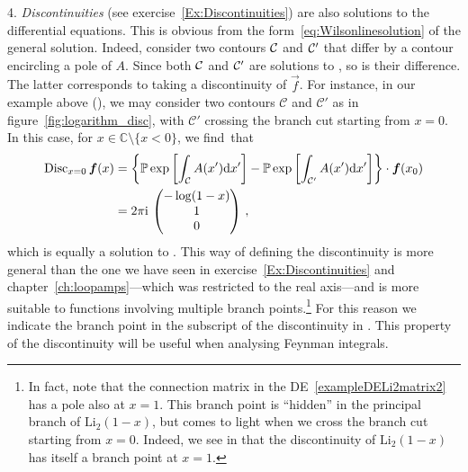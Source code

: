4. {\it Discontinuities} (see exercise~\ref{Ex:Discontinuities}) are also solutions to the differential equations. 
This is obvious from the form~\eqref{eq:Wilsonlinesolution} of the general solution.
Indeed, consider two contours ${\cal C}$ and ${\cal C'}$ that differ by a contour encircling a pole of $A$. 
Since both  ${\cal C}$ and ${\cal C'}$ are solutions to , so is their difference.
The latter corresponds to taking a discontinuity of $\vec{f}$.
For instance, in our example above (), we may consider two contours $\mathcal{C}$ and $\mathcal{C}'$ as in figure~\ref{fig:logarithm_disc}, with $\mathcal{C}'$ crossing the branch cut starting from $x=0$. In this case, for $x\in \mathbb{C} \setminus \{x<0\}$, we find~that
\begin{align} \label{eq:disc_example}
\begin{aligned}
{\rm Disc}_{x=0} \, \vec{f}(x) & = \left\{ \mathbb{P} \, \mathrm{exp}\left[\int_{\mathcal{C}} A(x') \d x' \right] - \mathbb{P} \, \mathrm{exp}\left[\int_{\mathcal{C}'} A(x') \d x' \right] \right\} \cdot \vec{f}(x_0) \\
 & = 2 \pi \i \, \begin{pmatrix}  -\log(1-x) \\ 1 \\ 0 \end{pmatrix} \,,
\end{aligned}
\end{align}
which is equally a solution to . This way of defining the discontinuity is more general than the one we have seen in exercise~\ref{Ex:Discontinuities} and chapter~\ref{ch:loopamps}---which was restricted to the real axis---and is more suitable to functions involving multiple branch points.\footnote{In fact, note that the connection matrix in the DE~\eqref{exampleDELi2matrix2} has a pole also at $x=1$. This branch point is ``hidden'' in the principal branch of $\mathrm{Li}_2(1-x)$, but comes to light when we cross the branch cut starting from $x=0$. Indeed, we see in  that the discontinuity of $\mathrm{Li}_2(1-x)$ has itself a branch point at $x=1$.} For this reason we indicate the branch point in the subscript of the discontinuity in . 
This property of the discontinuity will be useful when analysing Feynman integrals.



\smallskip

